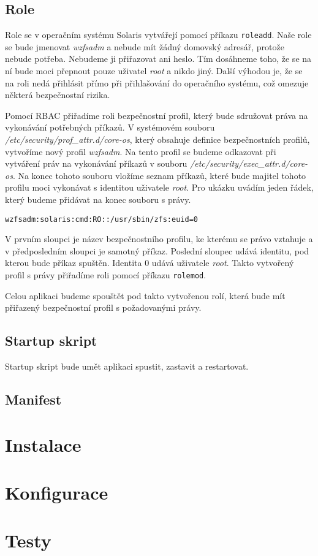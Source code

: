 \subsection{Role}
Role se v operačním systému Solaris vytvářejí pomocí příkazu \verb|roleadd|. Naše role se bude jmenovat \emph{wzfsadm} a nebude mít žádný domovský adresář, protože nebude potřeba. Nebudeme ji přiřazovat ani heslo. Tím dosáhneme toho, že se na ní bude moci přepnout pouze uživatel \emph{root} a nikdo jiný. Další výhodou je, že se na roli nedá přihlásit přímo při přihlašování do operačního systému, což omezuje některá bezpečnostní rizika.

Pomocí RBAC přiřadíme roli bezpečnostní profil, který bude sdružovat práva na vykonávání potřebných příkazů. V systémovém souboru \emph{/etc/security/prof\_attr.d/core-os}, který obsahuje definice bezpečnostních profilů, vytvoříme nový profil \emph{wzfsadm}. Na tento profil se budeme odkazovat při vytváření práv na vykonávání příkazů v souboru \emph{/etc/security/exec\_attr.d/core-os}. Na konec tohoto souboru vložíme seznam příkazů, které bude majitel tohoto profilu moci vykonávat s identitou uživatele \emph{root}. Pro ukázku uvádím jeden řádek, který budeme přidávat na konec souboru s právy.
\begin{verbatim}
wzfsadm:solaris:cmd:RO::/usr/sbin/zfs:euid=0
\end{verbatim}
V prvním sloupci je název bezpečnostního profilu, ke kterému se právo vztahuje a v předposledním sloupci je samotný příkaz. Poslední sloupec udává identitu, pod kterou bude příkaz spuštěn. Identita 0 udává uživatele \emph{root}. Takto vytvořený profil s právy přiřadíme roli pomocí příkazu \verb|rolemod|.

Celou aplikaci budeme spouštět pod takto vytvořenou rolí, která bude mít přiřazený bezpečnostní profil s požadovanými právy.
\subsection{Startup skript}
Startup skript bude umět aplikaci spustit, zastavit a restartovat.

\subsection{Manifest}



\section{Instalace}
\section{Konfigurace}
\section{Testy}

